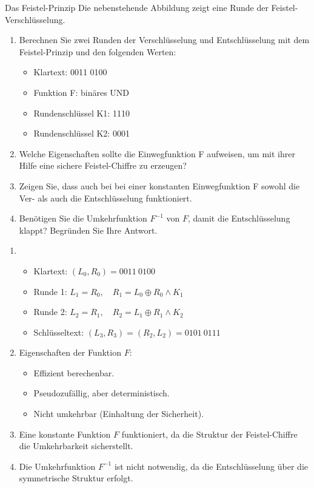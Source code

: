 \documentclass{article}
\begin{document}
\setcounter{subsection}{150}
\begin{exercise}{Das Feistel-Prinzip}\label{ex:feistel}
  Die nebenstehende Abbildung zeigt eine Runde der Feistel-Verschlüsselung. 
  
  \begin{enumerate}
    \item Berechnen Sie zwei Runden der Verschlüsselung und Entschlüsselung mit dem Feistel-Prinzip und den folgenden Werten:
      \begin{itemize}
        \item Klartext: 0011 0100
        \item Funktion F: binäres UND
        \item Rundenschlüssel K1: 1110
        \item Rundenschlüssel K2: 0001
      \end{itemize}
    \item Welche Eigenschaften sollte die Einwegfunktion F aufweisen, um mit ihrer Hilfe eine sichere Feistel-Chiffre zu erzeugen?
    \item Zeigen Sie, dass auch bei bei einer konstanten Einwegfunktion F sowohl die Ver- als auch die Entschlüsselung funktioniert.
    \item Benötigen Sie die Umkehrfunktion $F^{-1}$ von $F$, damit die Entschlüsselung klappt? Begründen Sie Ihre Antwort.
  \end{enumerate}

  \begin{solution}
    \begin{enumerate}
        \item
          \begin{itemize}
            \item Klartext: $(L_0, R_0) = 0011 \ 0100$
            \item Runde 1: $L_1 = R_0, \quad R_1 = L_0 \oplus R_0 \land K_1$
            \item Runde 2: $L_2 = R_1, \quad R_2 = L_1 \oplus R_1 \land K_2$
            \item Schlüsseltext: $(L_3, R_3) = (R_2, L_2) = 0101\ 0111$
          \end{itemize}

        \item Eigenschaften der Funktion $F$:
        \begin{itemize}
            \item Effizient berechenbar.
            \item Pseudozufällig, aber deterministisch.
            \item Nicht umkehrbar (Einhaltung der Sicherheit).
        \end{itemize}
        \item Eine konstante Funktion $F$ funktioniert, da die Struktur der Feistel-Chiffre die Umkehrbarkeit sicherstellt.
        \item Die Umkehrfunktion $F^{-1}$ ist nicht notwendig, da die Entschlüsselung über die symmetrische Struktur erfolgt.
    \end{enumerate}
  \end{solution}
\end{exercise}
\end{document}
